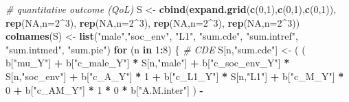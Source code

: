 \documentclass[
]{book}
\newenvironment{Shaded}{\begin{snugshade}}{\end{snugshade}}
\newcommand{\AttributeTok}[1]{\textcolor[rgb]{0.13,0.29,0.53}{#1}}
\newcommand{\CommentTok}[1]{\textcolor[rgb]{0.56,0.35,0.01}{\textit{#1}}}
\newcommand{\ConstantTok}[1]{\textcolor[rgb]{0.56,0.35,0.01}{#1}}
\newcommand{\ControlFlowTok}[1]{\textcolor[rgb]{0.13,0.29,0.53}{\textbf{#1}}}
\newcommand{\DecValTok}[1]{\textcolor[rgb]{0.00,0.00,0.81}{#1}}
\newcommand{\FunctionTok}[1]{\textcolor[rgb]{0.13,0.29,0.53}{\textbf{#1}}}
\newcommand{\NormalTok}[1]{#1}
\newcommand{\OtherTok}[1]{\textcolor[rgb]{0.56,0.35,0.01}{#1}}
\newcommand{\SpecialCharTok}[1]{\textcolor[rgb]{0.81,0.36,0.00}{\textbf{#1}}}
\newcommand{\StringTok}[1]{\textcolor[rgb]{0.31,0.60,0.02}{#1}}
\begin{document}
\begin{Shaded}
\begin{Highlighting}[]
  \CommentTok{\# quantitative outcome (QoL)}
\NormalTok{  S }\OtherTok{\textless{}{-}} \FunctionTok{cbind}\NormalTok{(}\FunctionTok{expand.grid}\NormalTok{(}\FunctionTok{c}\NormalTok{(}\DecValTok{0}\NormalTok{,}\DecValTok{1}\NormalTok{),}\FunctionTok{c}\NormalTok{(}\DecValTok{0}\NormalTok{,}\DecValTok{1}\NormalTok{),}\FunctionTok{c}\NormalTok{(}\DecValTok{0}\NormalTok{,}\DecValTok{1}\NormalTok{)), }\FunctionTok{rep}\NormalTok{(}\ConstantTok{NA}\NormalTok{,}\AttributeTok{n=}\DecValTok{2}\SpecialCharTok{\^{}}\DecValTok{3}\NormalTok{), }\FunctionTok{rep}\NormalTok{(}\ConstantTok{NA}\NormalTok{,}\AttributeTok{n=}\DecValTok{2}\SpecialCharTok{\^{}}\DecValTok{3}\NormalTok{), }
             \FunctionTok{rep}\NormalTok{(}\ConstantTok{NA}\NormalTok{,}\AttributeTok{n=}\DecValTok{2}\SpecialCharTok{\^{}}\DecValTok{3}\NormalTok{), }\FunctionTok{rep}\NormalTok{(}\ConstantTok{NA}\NormalTok{,}\AttributeTok{n=}\DecValTok{2}\SpecialCharTok{\^{}}\DecValTok{3}\NormalTok{))}
  \FunctionTok{colnames}\NormalTok{(S) }\OtherTok{\textless{}{-}} \FunctionTok{list}\NormalTok{(}\StringTok{"male"}\NormalTok{,}\StringTok{"soc\_env"}\NormalTok{, }\StringTok{"L1"}\NormalTok{, }\StringTok{"sum.cde"}\NormalTok{, }\StringTok{"sum.intref"}\NormalTok{, }
                      \StringTok{"sum.intmed"}\NormalTok{, }\StringTok{"sum.pie"}\NormalTok{)}
  \ControlFlowTok{for}\NormalTok{ (n }\ControlFlowTok{in} \DecValTok{1}\SpecialCharTok{:}\DecValTok{8}\NormalTok{) \{}
    \CommentTok{\# CDE }
\NormalTok{    S[n,}\StringTok{"sum.cde"}\NormalTok{] }\OtherTok{\textless{}{-}}\NormalTok{ ( ( b[}\StringTok{"mu\_Y"}\NormalTok{] }\SpecialCharTok{+} 
\NormalTok{                            b[}\StringTok{"c\_male\_Y"}\NormalTok{] }\SpecialCharTok{*}\NormalTok{ S[n,}\StringTok{"male"}\NormalTok{] }\SpecialCharTok{+} 
\NormalTok{                            b[}\StringTok{"c\_soc\_env\_Y"}\NormalTok{] }\SpecialCharTok{*}\NormalTok{ S[n,}\StringTok{"soc\_env"}\NormalTok{] }\SpecialCharTok{+} 
\NormalTok{                            b[}\StringTok{"c\_A\_Y"}\NormalTok{] }\SpecialCharTok{*} \DecValTok{1} \SpecialCharTok{+} 
\NormalTok{                            b[}\StringTok{"c\_L1\_Y"}\NormalTok{] }\SpecialCharTok{*}\NormalTok{ S[n,}\StringTok{"L1"}\NormalTok{] }\SpecialCharTok{+}
\NormalTok{                            b[}\StringTok{"c\_M\_Y"}\NormalTok{] }\SpecialCharTok{*} \DecValTok{0} \SpecialCharTok{+}
\NormalTok{                            b[}\StringTok{"c\_AM\_Y"}\NormalTok{] }\SpecialCharTok{*} \DecValTok{1} \SpecialCharTok{*} \DecValTok{0} \SpecialCharTok{*}\NormalTok{ b[}\StringTok{"A.M.inter"}\NormalTok{] ) }\SpecialCharTok{{-}} 

\end{Highlighting}
\end{Shaded}
\end{document}
